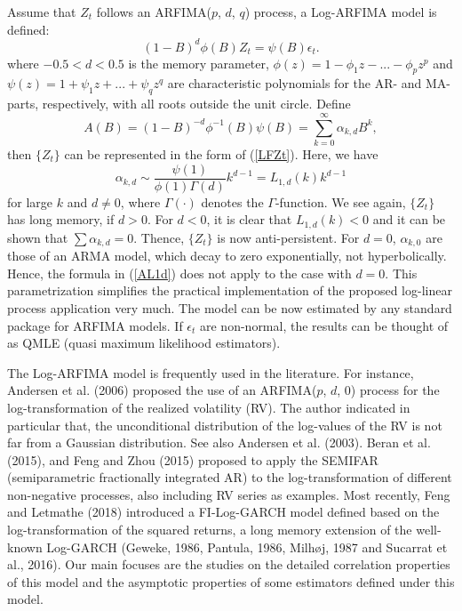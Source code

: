 \documentclass[12pt]{article}
\begin{document}
Assume that $Z_{t}$ follows an ARFIMA($p$, $d$, $q$) process, a Log-ARFIMA model is defined:
\begin{equation}
(1-B)^{d}\phi(B)Z_{t}=\psi(B)\epsilon_{t}. \label{Mzt}%
\end{equation}
where $-0.5<d<0.5$ is the memory parameter, $\phi(z)=1-\phi_{1}z-...-\phi
_{p}z^{p}$ and $\psi(z)=1+\psi_{1}z+...+\psi_{q}z^{q}$ are characteristic polynomials for the AR- and
MA-parts, respectively, with all roots outside the unit circle. Define 
\begin{equation}
A(B)=(1-B)^{-d}\phi^{-1}(B)\psi(B)= \sum_{k=0}^\infty \alpha_{k, d} B^k,
\end{equation}
then $\{Z_t\}$ can be represented in the form of (\ref{LFZt}). Here, we have
\begin{equation}\label{AL1d} 
\alpha_{k, d} \sim \frac{\psi(1)}{\phi(1)\Gamma(d)} k^{d-1}=L_{1, d}(k) k^{d-1} 
\end{equation}
for large $k$ and $d\ne0$, where $\Gamma(\cdot)$ denotes the $\Gamma$-function. We see again, $\{Z_t\}$ has long memory, if $d>0$. For $d<0$, it is clear that $L_{1, d}(k)<0$ and it can be shown that $\sum\alpha_{k, d}=0$. Thence, $\{Z_t\}$ is now anti-persistent. For $d=0$, $\alpha_{k,0}$ are those of an ARMA model, which decay to zero exponentially, not hyperbolically. Hence, the formula in (\ref{AL1d}) does not apply to the case with $d=0$. This parametrization simplifies the practical implementation of the proposed log-linear process application very much. The model can be now estimated by any standard package for ARFIMA models. If $\epsilon_t$ are non-normal, the results can be thought of as QMLE (quasi maximum likelihood estimators). 



The Log-ARFIMA model is frequently used in the literature. For instance, Andersen et al. (2006) proposed the use of an ARFIMA($p$, $d$, 0) process for the log-transformation of the realized volatility (RV). The author indicated in particular that, the unconditional distribution of the log-values of the RV is not far from a Gaussian distribution. See also Andersen et al. (2003). Beran et al. (2015), and Feng and Zhou (2015) proposed to apply the SEMIFAR (semiparametric fractionally integrated AR) to the log-transformation of different non-negative processes, also including RV series as examples. Most recently, Feng and Letmathe (2018) introduced a FI-Log-GARCH model defined based on the log-transformation of the squared returns, a long memory extension of the well-known Log-GARCH (Geweke, 1986, Pantula, 1986, Milh\o j, 1987 and Sucarrat et al., 2016). %
Our main focuses are the studies on the detailed correlation properties of this model and the asymptotic properties of some estimators defined under this model. 
\end{document}
